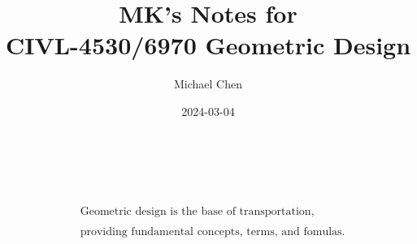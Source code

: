 \documentclass{article}
\title{MK's Notes for \\ CIVL-4530/6970 Geometric Design}
\date{2024-03-04}
\author{Michael Chen}
\begin{document}
  \maketitle

  \begin{align*}
  \\
  \\
  \\
  \\
  \\
  \\
  \\
  \\
  & \text{Geometric design is the base of transportation,}\\ 
  \\
  & \text{providing fundamental concepts, terms, and fomulas.}\\
  \end{align*}
  \newpage

  \tableofcontents
  \newpage


  
  \newpage
  
  \newpage
  
  \newpage
  
  \newpage

  
  \newpage


\end{document}
